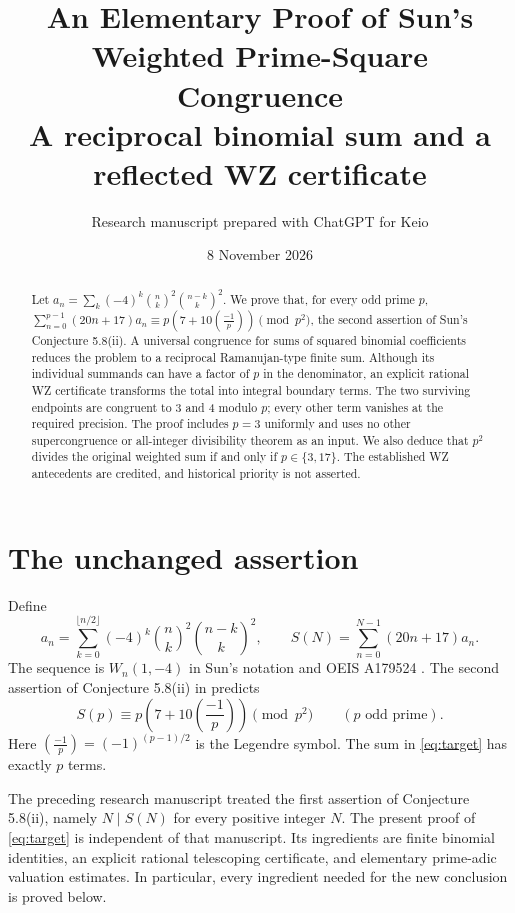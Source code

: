 \documentclass[11pt,a4paper]{article}
\title{\textbf{An Elementary Proof of Sun's\\Weighted Prime-Square Congruence}\\[5pt]
\large A reciprocal binomial sum and a reflected WZ certificate}
\author{Research manuscript prepared with ChatGPT for Keio}
\date{8 November 2026}
\theoremstyle{remark}\newtheorem{remark}[theorem]{Remark}
\begin{document}
\maketitle

\begin{abstract}
Let \(a_n=\sum_k(-4)^k\binom nk^2\binom{n-k}k^2\).
We prove that, for every odd prime \(p\),
\(\sum_{n=0}^{p-1}(20n+17)a_n\equiv
p(7+10(\frac{-1}{p}))\pmod{p^2}\),
the second assertion of Sun's Conjecture 5.8(ii).
A universal congruence for sums of squared binomial coefficients
reduces the problem to a reciprocal Ramanujan-type finite sum.
Although its individual summands can have a factor of \(p\) in the
denominator, an explicit rational WZ certificate transforms the total
into integral boundary terms. The two surviving endpoints are
congruent to 3 and 4 modulo \(p\); every other term vanishes at the
required precision. The proof includes \(p=3\) uniformly and uses
no other supercongruence or all-integer divisibility theorem as an
input. We also deduce that \(p^2\) divides the original weighted sum
if and only if \(p\in\{3,17\}\). The established WZ antecedents are
credited, and historical priority is not asserted.
\end{abstract}

\section{The unchanged assertion}

Define
\begin{equation}\label{eq:original}
 a_n=\sum_{k=0}^{\lfloor n/2\rfloor}
       (-4)^k\binom nk^2\binom{n-k}k^2,
 \qquad
 S(N)=\sum_{n=0}^{N-1}(20n+17)a_n.
\end{equation}
The sequence is \(W_n(1,-4)\) in Sun's notation and OEIS A179524
\cite{Sun2010,OEIS}. The second assertion of Conjecture 5.8(ii) in
\cite[printed p.~33]{Sun2010} predicts
\begin{equation}\label{eq:target}
 S(p)\equiv p\left(7+10\left(\frac{-1}{p}\right)\right)
          \pmod{p^2}\qquad(p\text{ odd prime}).
\end{equation}
Here \((\frac{-1}{p})=(-1)^{(p-1)/2}\) is the Legendre symbol.
The sum in \eqref{eq:target} has exactly \(p\) terms.

The preceding research manuscript \cite{Previous} treated the first
assertion of Conjecture 5.8(ii), namely \(N\mid S(N)\) for every
positive integer \(N\). The present proof of \eqref{eq:target} is
independent of that manuscript. Its ingredients are finite binomial
identities, an explicit rational telescoping certificate, and
elementary prime-adic valuation estimates. In particular, every
ingredient needed for the new conclusion is proved below.
\end{document}
